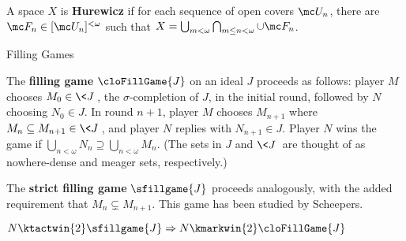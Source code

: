   \begin{defn}
    A space $X$ is \textbf{Hurewicz} if for each sequence of open covers $\mc U_n$, there are $\mc F_n \in [\mc U_n]^{<\omega}$ such that $X=\bigcup_{m<\omega}\bigcap_{m\leq n<\omega}\cup\mc F_n$.
  \end{defn}






















\newpage

  \centerline{Filling Games}

  \begin{defn}
    The \textbf{filling game} $\cloFillGame{J}$ on an ideal $J$ proceeds as follows: player $M$ chooses $M_0 \in \<J\>$, the $\sigma$-completion of $J$, in the initial round, followed by $N$ choosing $N_0\in J$. In round $n+1$, player $M$ chooses $M_{n+1}$ where $M_n\subseteq M_{n+1}\in\<J\>$, and player $N$ replies with $N_{n+1}\in J$. Player $N$ wins the game if $\bigcup_{n<\omega} N_n \supseteq \bigcup_{n<\omega} M_n$. (The sets in $J$ and $\<J\>$ are thought of as nowhere-dense and meager sets, respectively.)

    The \textbf{strict filling game} $\sfillgame{J}$ proceeds analogously, with the added requirement that $M_n\subsetneq M_{n+1}$. This game has been studied by Scheepers.
  \end{defn}

  \begin{thm}
    $N\ktactwin{2}\sfillgame{J} \Rightarrow N\kmarkwin{2}\cloFillGame{J}$
  \end{thm}

